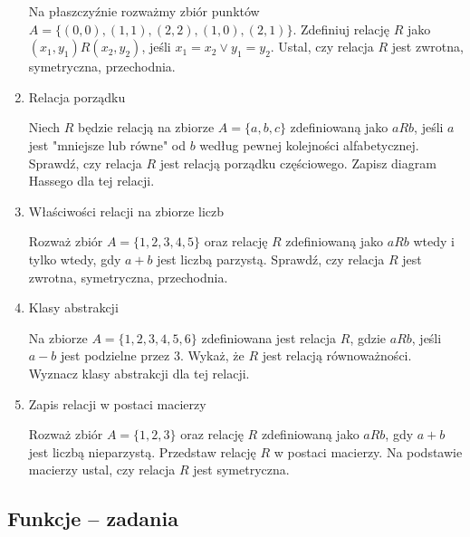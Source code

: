 \documentclass[12pt]{article}
\begin{document}
\begin{enumerate}
Na płaszczyźnie rozważmy zbiór punktów $ A = \{(0,0), (1,1), (2,2), (1,0), (2,1)\} $. Zdefiniuj relację $ R $ jako $ (x_1, y_1) R (x_2, y_2) $, jeśli $ x_1 = x_2 \lor y_1 = y_2$.  
Ustal, czy relacja $ R $ jest zwrotna, symetryczna, przechodnia.

\item 
Relacja porządku  

Niech $ R $ będzie relacją na zbiorze $ A = \{a, b, c\} $ zdefiniowaną jako $ a R b $, jeśli $ a $ jest "mniejsze lub równe" od $ b $ według pewnej kolejności alfabetycznej.  
Sprawdź, czy relacja $ R $ jest relacją porządku częściowego.  
Zapisz diagram Hassego dla tej relacji.

\item 
Właściwości relacji na zbiorze liczb  

Rozważ zbiór $ A = \{1, 2, 3, 4, 5\} $ oraz relację $ R $ zdefiniowaną jako $ a R b $ wtedy i tylko wtedy, gdy $ a + b $ jest liczbą parzystą.  
Sprawdź, czy relacja $ R $ jest zwrotna, symetryczna, przechodnia.  

\item 
Klasy abstrakcji  

Na zbiorze $ A = \{1, 2, 3, 4, 5, 6\} $ zdefiniowana jest relacja $ R $, gdzie $ a R b $, jeśli $ a - b $ jest podzielne przez 3.  
Wykaż, że $ R $ jest relacją równoważności.  
Wyznacz klasy abstrakcji dla tej relacji.

\item  Zapis relacji w postaci macierzy  

Rozważ zbiór $ A = \{1, 2, 3\} $ oraz relację $ R $ zdefiniowaną jako $ a R b $, gdy $ a + b $ jest liczbą nieparzystą.  
Przedstaw relację $ R $ w postaci macierzy.  
Na podstawie macierzy ustal, czy relacja $ R $ jest symetryczna.

\end{enumerate}

\subsection{Funkcje -- zadania}
\end{document}

